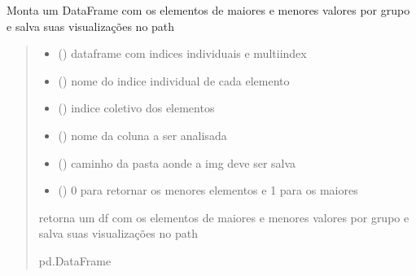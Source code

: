 \documentclass[letterpaper,10pt,english]{sphinxmanual}
\begin{document}
\begin{fulllineitems}
\label{\detokenize{index:functions.maiores_menores_idx}}
\pysigstartsignatures
{}
\pysigstopsignatures
\sphinxAtStartPar
Monta um DataFrame com os elementos de maiores e menores valores por grupo e salva suas visualizações no path
\begin{quote}\begin{description}
\begin{itemize}
\item {} 
\sphinxAtStartPar
{} () \textendash{} dataframe com indices individuais e multi\sphinxhyphen{}index

\item {} 
\sphinxAtStartPar
{} () \textendash{} nome do indice individual de cada elemento

\item {} 
\sphinxAtStartPar
{} () \textendash{} indice coletivo dos elementos

\item {} 
\sphinxAtStartPar
{} () \textendash{} nome da coluna a ser analisada

\item {} 
\sphinxAtStartPar
{} () \textendash{} caminho da pasta aonde a img deve ser salva

\item {} 
\sphinxAtStartPar
{} () \textendash{} 0 para retornar os menores elementos e 1 para os maiores

\end{itemize}

\sphinxAtStartPar
retorna um df com os elementos de maiores e menores valores por grupo e salva suas visualizações no path

\sphinxAtStartPar
pd.DataFrame

\end{description}\end{quote}

\end{fulllineitems}
\end{document}
